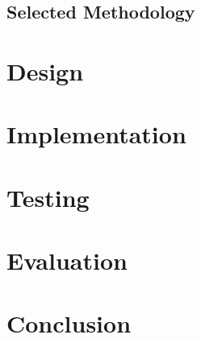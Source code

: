 \documentclass[11pt]{book}
\begin{document}
\section{Selected Methodology} 

\chapter{Design}

\chapter{Implementation}

\chapter{Testing}

\chapter{Evaluation}

\chapter{Conclusion}
\end{document}
